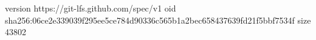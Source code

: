 version https://git-lfs.github.com/spec/v1
oid sha256:06ce2e339039f295ee5ce784d90336c565b1a2bec658437639fd21f5bbf7534f
size 43802
